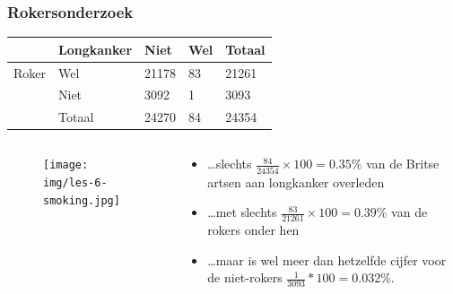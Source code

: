 \begin{frame}
	\frametitle{Rokersonderzoek}
	\begin{table}[h]
		\begin{tabular}{@{}lllll@{}}
			\toprule
			& \textbf{Longkanker} & \textbf{Niet} & \textbf{Wel} & \textbf{Totaal} \\ \midrule
			Roker & Wel                 & 21178         & 83           & 21261           \\
			& Niet                & 3092          & 1            & 3093            \\
			& Totaal              & 24270         & 84           & 24354           \\ \bottomrule
		\end{tabular}
	\end{table}
	
	\begin{columns}
		\begin{column}{0.3 \textwidth}
			
			\begin{figure}
				\centering
				\texttt{[image: img/les-6-smoking.jpg]}
			\end{figure}
			
		\end{column}
		\begin{column}{0.7 \textwidth}
			
			\begin{itemize}
				\item \dots slechts $\frac{84}{ 24354} \times 100 = 0.35\% $ van de Britse artsen aan longkanker overleden
				\item \dots met slechts $\frac{83}{21261} \times 100 = 0.39\%$ van de rokers onder hen
				\item \dots maar  is wel  meer dan hetzelfde cijfer voor de niet-rokers $\frac{1}{3093} * 100 = 0.032\%$.
			\end{itemize}
		\end{column}
	\end{columns}
\end{frame}



